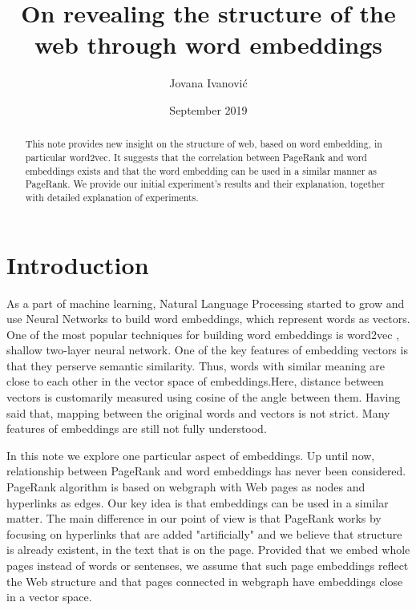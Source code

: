 \documentclass{article}
\title{On revealing the structure of the web through word embeddings}
\author{Jovana Ivanović }
\date{September 2019}
\begin{document}
\maketitle
\begin{abstract}
   This note provides new insight on the structure of web, based on word embedding, in particular word2vec. It suggests that the correlation between PageRank and word embeddings exists and that the word embedding can be used in a similar manner as PageRank. We provide our initial experiment's results and their explanation, together with detailed explanation of experiments. 
\end{abstract}
\section{Introduction}
As a part of machine learning, Natural Language Processing started to grow and use Neural Networks to build word embeddings, which represent words as vectors. One of the most popular techniques for building word embeddings is word2vec \cite{word2vec}, shallow two-layer neural network. One of the key features of embedding vectors is that they perserve semantic similarity. Thus, words with similar meaning are close to each other in the vector space of embeddings.Here, distance between vectors is customarily measured using cosine of the angle between them. Having said that, mapping between the original words and vectors is not strict. Many features of embeddings are still not fully understood.\newline

In this note we explore one particular aspect of embeddings. Up until now, relationship between PageRank \cite{PageRank} and word embeddings has never been considered. PageRank algorithm is based on webgraph with Web pages as nodes and hyperlinks as edges. Our key idea is that embeddings can be used in a similar matter. The main difference in our point of view is that PageRank works by focusing on hyperlinks that are added "artificially" and we believe that structure is already existent, in the text that is on the page. Provided that we embed whole pages instead of words or sentenses, we assume that such page embeddings reflect the Web structure and that pages connected in webgraph have embeddings close in a vector space. 
\end{document}
